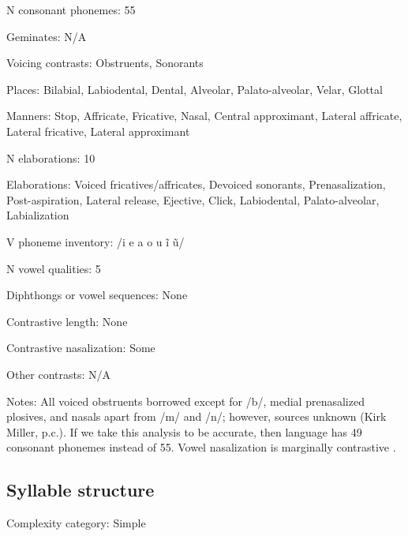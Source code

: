 {\begin{appendixdesc}
\item[N consonant phonemes:] 55

\item[Geminates:] N/A

\item[Voicing contrasts:] Obstruents, Sonorants

\item[Places:] Bilabial, Labiodental, Dental, Alveolar, Palato-alveolar, Velar, Glottal

\item[Manners:] Stop, Affricate, Fricative, Nasal, Central approximant, Lateral affricate, Lateral fricative, Lateral approximant

\item[N elaborations:] 10

\item[Elaborations:] Voiced fricatives/affricates, Devoiced sonorants, Prenasalization, Post-aspiration, Lateral release, Ejective, Click, Labiodental, Palato-alveolar, Labialization

\item[V phoneme inventory:] /i e a o u ĩ ũ/

\item[N vowel qualities:] 5

\item[Diphthongs or vowel sequences:] None

\item[Contrastive length:] None

\item[Contrastive nasalization:] Some

\item[Other contrasts:] N/A

\item[Notes:] All voiced obstruents borrowed except for /b/, medial prenasalized plosives, and nasals apart from /m/ and /n/; however, sources unknown (Kirk Miller, p.c.). If we take this analysis to be accurate, then language has 49 consonant phonemes instead of 55. Vowel nasalization is marginally contrastive \citep[38]{Sands2013}.
\end{appendixdesc}
\subsection*{Syllable structure}
\begin{appendixdesc}

\item[Complexity category:] Simple


\end{appendixdesc}}
